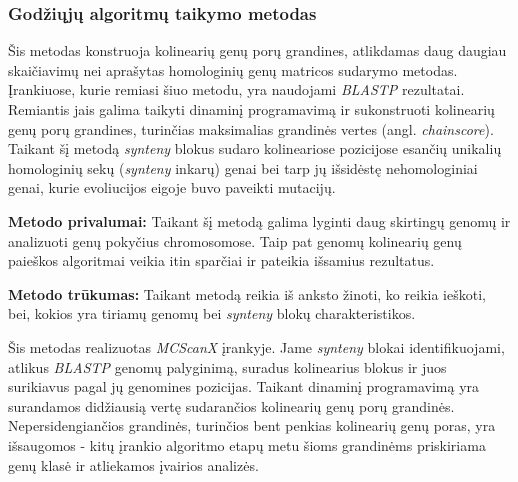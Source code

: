 \documentclass[12pt]{article}
\begin{document}

\subsubsection*{Godžiųjų algoritmų taikymo metodas}
Šis metodas konstruoja kolinearių genų porų grandines, atlikdamas daug daugiau
skaičiavimų nei aprašytas homologinių genų matricos sudarymo metodas.
Įrankiuose, kurie remiasi šiuo metodu, yra naudojami \emph{BLASTP} rezultatai.
Remiantis jais galima taikyti dinaminį programavimą ir sukonstruoti kolinearių
genų porų grandines, turinčias maksimalias grandinės vertes (angl.
\emph{chainscore}). Taikant šį metodą \emph{synteny} blokus sudaro kolineariose
pozicijose esančių unikalių homologinių sekų (\emph{synteny} inkarų) genai bei
tarp jų išsidėstę nehomologiniai genai, kurie evoliucijos eigoje buvo paveikti
mutacijų.

\textbf{Metodo privalumai:} Taikant šį metodą galima lyginti daug skirtingų
genomų ir analizuoti genų pokyčius chromosomose. Taip pat genomų kolinearių
genų paieškos algoritmai veikia itin sparčiai ir pateikia išsamius rezultatus.

\textbf{Metodo trūkumas:} Taikant metodą reikia iš anksto žinoti, ko reikia
ieškoti, bei, kokios yra tiriamų genomų bei \emph{synteny} blokų
charakteristikos.

Šis metodas realizuotas \emph{MCScanX}\cite{MCSCANX} įrankyje. Jame
\emph{synteny} blokai identifikuojami, atlikus \emph{BLASTP} genomų palyginimą,
suradus kolinearius blokus ir juos surikiavus pagal jų genomines pozicijas.
Taikant dinaminį programavimą yra surandamos didžiausią vertę sudarančios
kolinearių genų porų grandinės. Nepersidengiančios grandinės, turinčios bent
penkias kolinearių genų poras, yra išsaugomos - kitų įrankio algoritmo etapų
metu šioms grandinėms priskiriama genų klasė ir atliekamos įvairios analizės.

\end{document}
